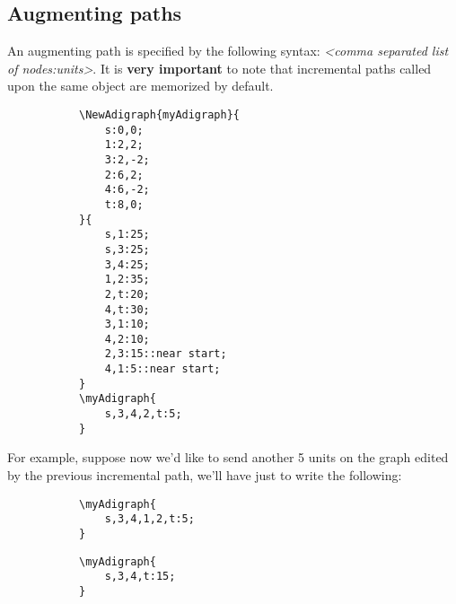 \documentclass{report}
\begin{document}
\subsection{Augmenting paths}
An augmenting path is specified by the following syntax: \textit{<comma separated list of nodes:units>}. It is \textbf{very important} to note that incremental paths called upon the same object are memorized by default.


\begin{figure}
	\begin{subfigure}{0.49\textwidth}
		\begin{verbatim}
\NewAdigraph{myAdigraph}{
	s:0,0;
	1:2,2;
	3:2,-2;
	2:6,2;
	4:6,-2;
	t:8,0;
}{
	s,1:25;
	s,3:25;
	3,4:25;
	1,2:35;
	2,t:20;
	4,t:30;
	3,1:10;
	4,2:10;
	2,3:15::near start;
	4,1:5::near start;
}
\myAdigraph{
	s,3,4,2,t:5;
}
\end{verbatim}
	\end{subfigure}
	\begin{subfigure}{0.49\textwidth}
	\end{subfigure}
\end{figure}

For example, suppose now we'd like to send another 5 units on the graph edited by the previous incremental path, we'll have just to write the following:

\begin{figure}
	\begin{subfigure}{0.49\textwidth}
		\begin{verbatim}
\myAdigraph{
	s,3,4,1,2,t:5;
}
\end{verbatim}
	\end{subfigure}
	\begin{subfigure}{0.49\textwidth}
	\end{subfigure}
\end{figure}

\begin{figure}
	\begin{subfigure}{0.49\textwidth}
		\begin{verbatim}
\myAdigraph{
	s,3,4,t:15;
}
\end{verbatim}
	\end{subfigure}
	\begin{subfigure}{0.49\textwidth}
	\end{subfigure}
\end{figure}
\end{document}
